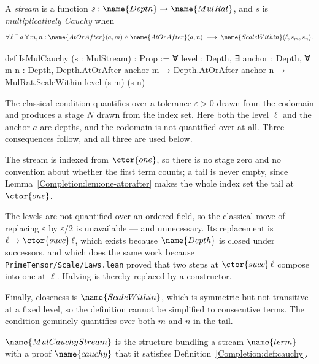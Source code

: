 \begin{definition}
\label{Completion:def:cauchy}
A \emph{stream} is a function $s : \name{Depth} \to \name{MulRat}$, and $s$ is
\emph{multiplicatively Cauchy} when
\[
  \forall\, \ell\; \exists\, a\; \forall\, m,n :
    \name{AtOrAfter}(a,m) \wedge \name{AtOrAfter}(a,n)
    \;\longrightarrow\;
    \name{ScaleWithin}(\ell, s_m, s_n).
\]
\end{definition}

\begin{leancode}
def IsMulCauchy (s : MulStream) : Prop :=
  ∀ level : Depth,
    ∃ anchor : Depth,
      ∀ m n : Depth,
        Depth.AtOrAfter anchor m →
        Depth.AtOrAfter anchor n →
        MulRat.ScaleWithin level (s m) (s n)
\end{leancode}

\begin{designnote}\label{Completion:note:one-type}
The classical condition quantifies over a tolerance $\varepsilon > 0$ drawn
from the codomain and produces a stage $N$ drawn from the index set.  Here both
the level $\ell$ and the anchor $a$ are depths, and the codomain is not
quantified over at all.  Three consequences follow, and all three are used
below.

The stream is indexed from $\ctor{one}$, so there is no stage zero and no
convention about whether the first term counts; a tail is never empty, since
Lemma~\ref{Completion:lem:one-atorafter} makes the whole index set the tail at
$\ctor{one}$.

The levels are not quantified over an ordered field, so the classical move of
replacing $\varepsilon$ by $\varepsilon/2$ is unavailable --- and unnecessary.
Its replacement is $\ell \mapsto \ctor{succ}\,\ell$, which exists because
$\name{Depth}$ is closed under successors, and which does the same work because
\texttt{PrimeTensor/Scale/Laws.lean} proved that two steps at
$\ctor{succ}\,\ell$ compose into one at $\ell$.  Halving is thereby replaced by
a constructor.

Finally, closeness is $\name{ScaleWithin}$, which is symmetric but not
transitive at a fixed level, so the definition cannot be simplified to
consecutive terms.  The condition genuinely quantifies over both $m$ and $n$ in
the tail.
\end{designnote}

\begin{definition}\label{Completion:def:stream}
$\name{MulCauchyStream}$ is the structure bundling a stream $\name{term}$ with
a proof $\name{cauchy}$ that it satisfies
Definition~\ref{Completion:def:cauchy}.
\end{definition}

